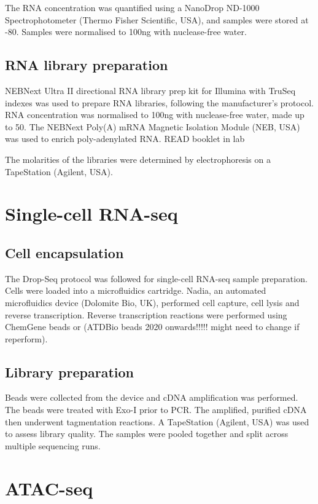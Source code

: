The RNA concentration was quantified using a NanoDrop ND-1000 Spectrophotometer (Thermo Fisher Scientific, USA), and samples were stored at -80\C{}.
Samples were normalised to 100\si{\ng} with nuclease-free water.


\subsection{RNA library preparation}
NEBNext\textsuperscript{\textregistered} Ultra II directional RNA library prep kit for Illumina\textsuperscript{\textregistered} with TruSeq indexes was used to prepare RNA libraries, following the manufacturer's protocol.
RNA concentration was normalised to 100\si{\ng} with nuclease-free water, made up to 50\ul{}.
The NEBNext Poly(A) mRNA Magnetic Isolation Module (NEB, USA) was used to enrich poly-adenylated RNA. READ booklet in lab


The molarities of the libraries were determined by electrophoresis on a TapeStation (Agilent, USA).

\section{Single-cell RNA-seq}
\subsection{Cell encapsulation}
The Drop-Seq protocol\cite{macosko2015highly} was followed for single-cell RNA-seq sample preparation.
Cells were loaded into a microfluidics cartridge.
Nadia, an automated microfluidics device (Dolomite Bio, UK), performed cell capture, cell lysis and reverse transcription.
Reverse transcription reactions were performed using ChemGene beads or (ATDBio beads 2020 onwards!!!!! might need to change if reperform).

\subsection{Library preparation}
Beads were collected from the device and cDNA amplification was performed.
The beads were treated with Exo-I prior to PCR.
The amplified, purified cDNA then underwent tagmentation reactions.
A TapeStation (Agilent, USA) was used to assess library quality.
The samples were pooled together and split across multiple sequencing runs.


\section{ATAC-seq}\label{sec:methods_atac}

